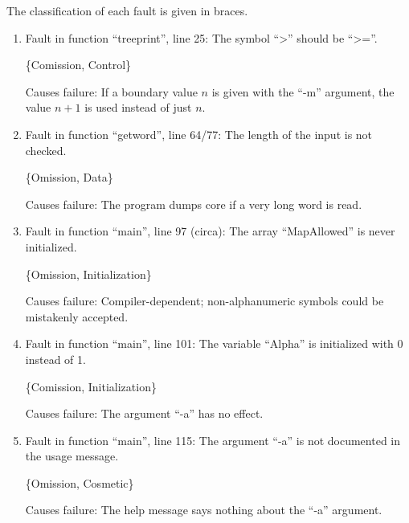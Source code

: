 %
%

The classification of each fault is given in braces.

\begin{enumerate}

\item Fault in function ``treeprint'', line 25: 
The symbol ``>'' should be ``>=''.

\{Comission, Control\}

Causes failure:
If a boundary value $n$ is given with the ``-m'' argument, 
the value $n + 1$ is used instead of just $n$.


\item Fault in function ``getword'', line 64/77: 
The length of the input is not checked.

\{Omission, Data\}

Causes failure:
The program dumps core if a very long word is read.


\item Fault in function ``main'', line 97 (circa): 
The array ``MapAllowed'' is never initialized.

\{Omission, Initialization\}

Causes failure:  Compiler-dependent; non-alphanumeric symbols could
be mistakenly accepted.


\item Fault in function ``main'', line 101: 
The variable ``Alpha'' is initialized with 0 instead of 1.

\{Comission, Initialization\}

Causes failure:
The argument ``-a'' has no effect.


\item Fault in function ``main'', line 115:
The argument ``-a'' is not documented in the usage message.

\{Omission, Cosmetic\}

Causes failure:
The help message says nothing about the ``-a'' argument.

\end{enumerate}


